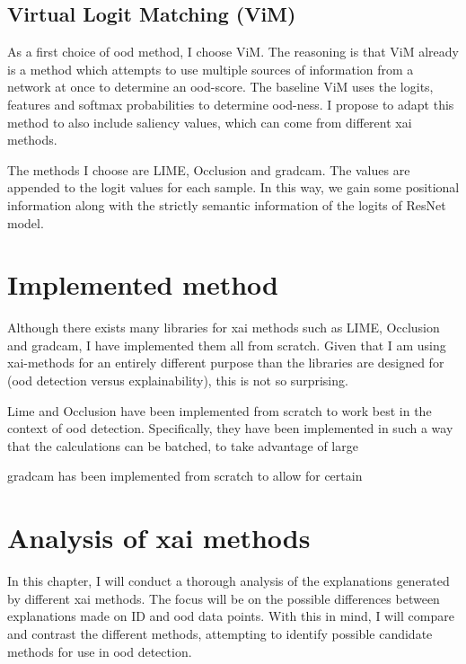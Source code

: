 \documentclass[UKenglish]{uiomasterthesis} %
\theoremstyle{definition}
\begin{document}
\subsection{Virtual Logit Matching (ViM)}

As a first choice of \ac{ood} method, I choose ViM. The reasoning is that ViM already is a method which attempts to use multiple sources of information from a network at once to determine an \ac{ood}-score. The baseline ViM uses the logits, features and softmax probabilities to determine \ac{ood}-ness. I propose to adapt this method to also include saliency values, which can come from different \ac{xai} methods.

The methods I choose are LIME, Occlusion and \ac{gradcam}. The values are appended to the logit values for each sample. In this way, we gain some positional information along with the strictly semantic information of the logits of ResNet model.

\section{Implemented method}

Although there exists many libraries for \ac{xai} methods such as LIME, Occlusion and \ac{gradcam}, I have implemented them all from scratch. Given that I am using \ac{xai}-methods for an entirely different purpose than the libraries are designed for (\ac{ood} detection versus explainability), this is not so surprising.

Lime and Occlusion have been implemented from scratch to work best in the context of \ac{ood} detection. Specifically, they have been implemented in such a way that the calculations can be batched, to take advantage of large 

\ac{gradcam} has been implemented from scratch to allow for certain

\section{Analysis of \ac{xai} methods}


In this chapter, I will conduct a thorough analysis of the explanations generated by different \ac{xai} methods. The focus will be on the possible differences between explanations made on ID and \ac{ood} data points. With this in mind, I will compare and contrast the different methods, attempting to identify possible candidate methods for use in \ac{ood} detection.
\end{document}
